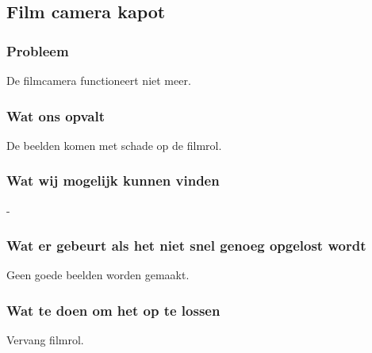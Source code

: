 \subsection{Film camera kapot}

\subsubsection{Probleem}
De filmcamera functioneert niet meer.

\subsubsection{Wat ons opvalt}
De beelden komen met schade op de filmrol.

\subsubsection{Wat wij mogelijk kunnen vinden}
-

\subsubsection{Wat er gebeurt als het niet snel genoeg opgelost wordt}
Geen goede beelden worden gemaakt.

\subsubsection{Wat te doen om het op te lossen}
Vervang filmrol.
